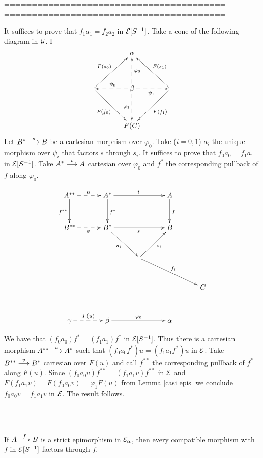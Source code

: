 {\erojo 
========================================
========================================

It suffices to prove that $f_1 a_1 = f_2  a_2$ in 
$\mathcal{E}[S^{-1}]$. 
Take a cone of the following diagram in $\mathcal{G}$.
I
 \[
\xymatrix @+3ex {  & \alpha & \\
		  {} \ar[ur]^{F(s_0)} \ar[dr]_{F(f_0)} & \beta  \ar@{-->}[u]_{\varphi_0} \ar@{-->}[d]_{\varphi_1} \ar@{-->}[l]_{\psi_0} \ar@{-->}[r]_{\psi_1} & {} \ar[ul]_{F(s_1)} \ar[dl]^{F(f_1)}\\
		    & F(C) &} 
 \] 
\noindent Let $B^* \overset {s} {\longrightarrow} B$ be a cartesian morphism over $\varphi_0$. Take ($i=0,1$) $a_i$ the unique morphism over $\psi_i$ that factors $s$ through $s_i$. It suffices to prove that $f_0 a_0=f_1  a_1$ in $\mathcal{E}[S^{-1}]$. Take $A^* \overset {t} {\longrightarrow} A$ cartesian over $\varphi_0$ and $f^*$ the corresponding pullback of $f$ along $\varphi_0$. 
 
 
\[
\xymatrix @+2ex {A^{**} \ar@{-->}[r]^u \ar[d]_{f^{**}} \ar@{}[dr]|\equiv& A^* \ar[rr]^t \ar[d]^{f^*} && A \ar[d]^f \ar@{}[dll]|\equiv \\
		  B^{**} \ar@{-->}[r]_v  & B^* \ar[rr]_s \ar[dr]_{a_i} && B \\
		   && {} \ar@{}[u]|\equiv \ar[ur]_{s_i} \ar[drr]^{f_i}& \\
		  &{} & {} && C \\
		  \gamma \ar@{-->}[r]^{F(u)}&\beta  \ar[rr]^{\varphi_0}&& \alpha }
\] 
 
 We have that $(f_0  a_0)f^*=(f_1  a_1)f^*$ in $\mathcal{E}[S^{-1}]$. Thus there is a cartesian morphism {$A^{**} \overset {u} {\longrightarrow} A^*$} such that $(f_0  a_0f^*)u=(f_1  a_1f^*)u$ in $\mathcal{E}$. Take ${B^{**} \overset {v} {\longrightarrow} B^*}$ cartesian over $F(u)$ and call $f^{**}$ the corresponding pullback of $f^*$ along $F(u)$. Since  $(f_0  a_0v)f^{**}=(f_1 a_1v)f^{**}$ in $\mathcal{E}$ and $F(f_1 a_1v)=F(f_0 a_0v)=\varphi_1F(u)$ from Lemma \ref{casi epis} we conclude  $f_0  a_0v=f_1 a_1v$ in $\mathcal{E}$. The result follows.

 =======================================  
 =======================================
}

\begin{proposition}\label{factorizacion a travez de epis}
If $A \overset {f} {\longrightarrow} B$ is a strict epimorphism in $\mathcal{E}_\alpha$, then every compatible morphism with $f$ in $\mathcal{E}[S^{-1}]$ factors through $f$.
\end{proposition}

